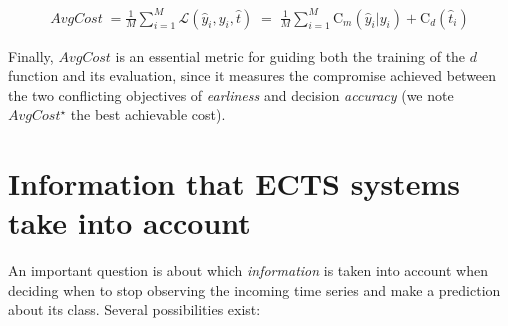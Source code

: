 \documentclass[sigconf, nonacm, table]{acmart}
\begin{document}
\vspace{-5mm}

\begin{align}
    AvgCost \; = \frac{1}{M} \sum_{i=1}^{M} \mathcal{L}(\hat{y}_i, y_i, \hat{t}) \; = \; \frac{1}{M} \sum_{i=1}^{M} \mathrm{C}_m(\hat{y}_i|y_i) +  \mathrm{C}_d(\hat{t}_i)
    \label{eq:avgcost_train}
\end{align}

\vspace{-1mm}

Finally, $AvgCost$ is an essential metric for guiding both the training of the $d$ function and its evaluation, since it measures the compromise achieved between the two conflicting objectives of \textit{earliness} and decision \textit{accuracy} (we note $AvgCost^\star$ the best achievable cost).






 
















 






\section{Information that ECTS systems take into account
\label{sec_information_input_ECTS}}

\noindent
An important question is about which \textit{information} is taken into account when deciding when to stop observing the incoming time series and make a prediction about its class. 
Several possibilities exist:
\end{document}
